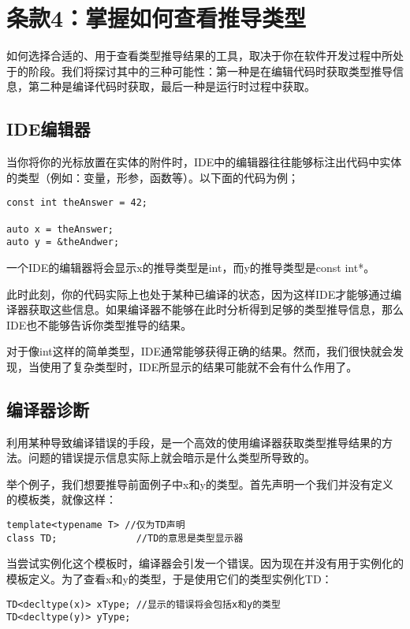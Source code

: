 \section{条款4：掌握如何查看推导类型}

如何选择合适的、用于查看类型推导结果的工具，取决于你在软件开发过程中所处于的阶段。我们将探讨其中的三种可能性：第一种是在编辑代码时获取类型推导信息，第二种是编译代码时获取，最后一种是运行时过程中获取。

\subsection{IDE编辑器}
当你将你的光标放置在实体的附件时，IDE中的编辑器往往能够标注出代码中实体的类型（例如：变量，形参，函数等）。以下面的代码为例；

\begin{lstlisting}
const int theAnswer = 42;

auto x = theAnswer;
auto y = &theAndwer;
\end{lstlisting}

一个IDE的编辑器将会显示x的推导类型是int，而y的推导类型是const int*。

此时此刻，你的代码实际上也处于某种已编译的状态，因为这样IDE才能够通过编译器获取这些信息。如果编译器不能够在此时分析得到足够的类型推导信息，那么IDE也不能够告诉你类型推导的结果。

对于像int这样的简单类型，IDE通常能够获得正确的结果。然而，我们很快就会发现，当使用了复杂类型时，IDE所显示的结果可能就不会有什么作用了。

\subsection{编译器诊断}

利用某种导致编译错误的手段，是一个高效的使用编译器获取类型推导结果的方法。问题的错误提示信息实际上就会暗示是什么类型所导致的。

举个例子，我们想要推导前面例子中x和y的类型。首先声明一个我们并没有定义的模板类，就像这样：

\begin{lstlisting}
template<typename T> //仅为TD声明
class TD;	           //TD的意思是类型显示器
\end{lstlisting}

当尝试实例化这个模板时，编译器会引发一个错误。因为现在并没有用于实例化的模板定义。为了查看x和y的类型，于是使用它们的类型实例化TD：

\begin{lstlisting}
TD<decltype(x)> xType; //显示的错误将会包括x和y的类型
TD<decltype(y)> yType;
\end{lstlisting}

